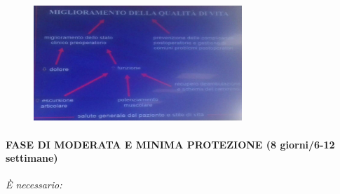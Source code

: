 \begin{figure}[!ht]
\centering
	\includegraphics[width=0.7\textwidth]{031/image4.jpeg}
\end{figure}


\paragraph{FASE DI MODERATA E MINIMA PROTEZIONE (8 giorni/6-12 settimane)}


\emph{È necessario:}

